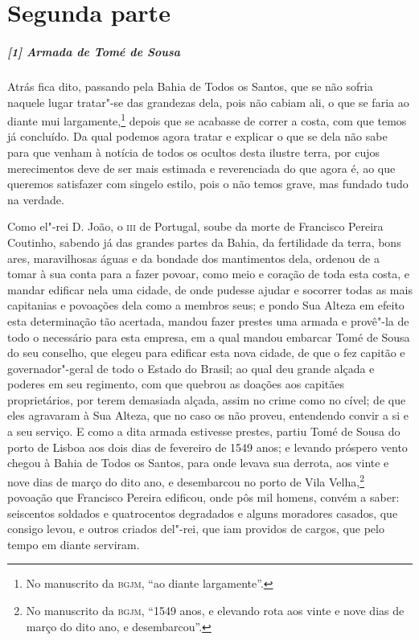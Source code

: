 \chapter[Segunda parte: Memorial e declaração]{Segunda parte }


\paragraph{[1] Armada de Tomé de Sousa} \quad
Atrás fica dito, passando pela Bahia de Todos os Santos, que se não sofria naquele lugar
tratar"-se das grandezas dela, pois não cabiam ali, o que se faria ao diante mui
largamente,\footnote{ No manuscrito da \textsc{bgjm}, ``ao diante largamente''.} depois
que se acabasse de correr a costa, com que temos já concluído. Da qual podemos agora
tratar e explicar o que se dela não sabe para que venham à notícia de todos os ocultos
desta ilustre terra, por cujos merecimentos deve de ser mais estimada e reverenciada do
que agora é, ao que queremos satisfazer com singelo estilo, pois o não temos grave, mas
fundado tudo na verdade.

Como el"-rei D. João, o \textsc{iii} de Portugal, soube da morte de Francisco Pereira
Coutinho, sabendo já das grandes partes da Bahia, da fertilidade da terra, bons ares,
maravilhosas águas e da bondade dos mantimentos dela, ordenou de a tomar à sua conta para
a fazer povoar, como meio e coração de toda esta costa, e mandar edificar nela uma cidade,
de onde pudesse ajudar e socorrer todas as mais capitanias e povoações dela como a membros
seus; e pondo Sua Alteza em efeito esta determinação tão acertada, mandou fazer prestes
uma armada e provê"-la de todo o necessário para esta empresa, em a qual mandou embarcar
Tomé de Sousa do seu conselho, que elegeu para edificar esta nova cidade, de que o fez
capitão e governador"-geral de todo o Estado do Brasil; ao qual deu grande alçada e poderes
em seu regimento, com que quebrou as doações aos capitães proprietários, por terem
demasiada alçada, assim no crime como no cível; de que eles agravaram à Sua Alteza, que no
caso os não proveu, entendendo convir a si e a seu serviço. E como a dita armada estivesse
prestes, partiu Tomé de Sousa do porto de Lisboa aos dois dias de fevereiro de 1549 anos;
e levando próspero vento chegou à Bahia de Todos os Santos, para onde levava sua derrota,
aos vinte e nove dias de março do dito ano, e desembarcou no porto de Vila
Velha,\footnote{ No manuscrito da \textsc{bgjm}, ``1549 anos, e elevando rota aos vinte e
nove dias de março do dito ano, e desembarcou''.} povoação que Francisco Pereira edificou,
onde pôs mil homens, convém a saber: seiscentos soldados e quatrocentos degradados e
alguns moradores casados, que consigo levou, e outros criados del"-rei, que iam providos de
cargos, que pelo tempo em diante serviram.

